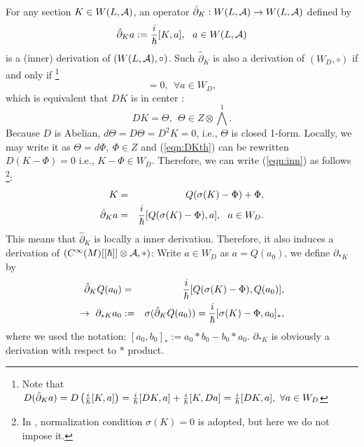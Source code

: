 \documentclass[10pt,a4paper]{article}
\def\h{\hbar}
\begin{document}
For any section $K\in W(L,{\cal A})$, an operator ${\hat \partial}_K:W(L,{\cal A})\rightarrow W(L,{\cal A})$ defined by
\begin{equation}
\label{eqn:inn}
{\hat \partial}_Ka:={i\over\h}[K,a],\ \ a\in W(L,{\cal A})
\end{equation}
is a (inner) derivation of $(W(L,{\cal A}),\circ)$.
Such ${\hat \partial}_K$ is also a derivation of $(W_D,\circ)$ if and only if
\footnote{
Note that $D({\hat \partial}_Ka)=D\left({i\over\h}[K,a]\right)={i\over\h}[DK,a]+{i\over\h}[K,Da]={i\over\h}[DK,a],\ \forall a\in W_D$
}
\begin{equation}
[DK,a]=0,\ \ \forall a\in W_D,
\end{equation}
which is equivalent that $DK$ is in center \cite{Fedbk}:
\begin{equation}
\label{eqn:DKth}
DK=\Theta,\ \ \Theta\in Z\otimes {\scriptstyle \bigwedge}^1.
\end{equation}
Because $D$ is Abelian, $d\Theta=D\Theta=D^2K=0$, i.e., $\Theta$ is closed 1-form. Locally, we may write it as $\Theta=d\Phi,\ \Phi\in Z$ and (\ref{eqn:DKth}) can be rewritten $D(K-\Phi)=0$ i.e., $K-\Phi\in W_D$. Therefore, we can write (\ref{eqn:inn}) as follows
\footnote{
In \cite{Xu}, normalization condition $\sigma(K)=0$ is adopted, but here we do not impose it.
}:
\begin{eqnarray}
K&=&Q(\sigma(K)-\Phi)+\Phi,\nonumber\\
{\hat \partial}_Ka&=&{i\over\h}[Q(\sigma(K)-\Phi),a],\ \ a\in W_D.
\end{eqnarray}
This means that ${\hat \partial}_K$ is locally a inner derivation. Therefore, it also induces a derivation of $(C^\infty(M)[[\h]]\otimes {\cal A},*)$: Write $a\in W_D$ as $a=Q(a_0)$, we define $\partial_{*K}$ by
\begin{eqnarray}
{\hat \partial}_KQ(a_0)&=&{i\over\h}[Q(\sigma(K)-\Phi),Q(a_0)], \nonumber\\
\rightarrow \ \partial_{*K}a_0&:=&\sigma({\hat \partial}_K Q(a_0))={i\over\h}[\sigma(K)-\Phi,a_0]_*,
\end{eqnarray}
where we used the notation: $[a_0,b_0]_*:=a_0*b_0-b_0*a_0$. 
$\partial_{*K}$ is obviously a derivation with respect to $*$ product.\\
\end{document}
